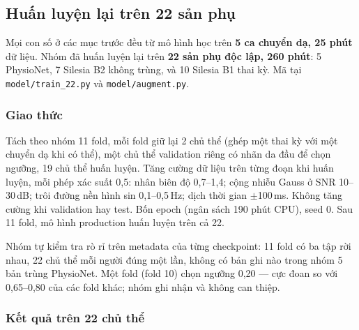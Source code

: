 \subsection{Huấn luyện lại trên 22 sản phụ}
\label{sec:model22}

Mọi con số ở các mục trước đều từ mô hình học trên \textbf{5 ca chuyển dạ, 25 phút} dữ liệu. Nhóm đã huấn
luyện lại trên \textbf{22 sản phụ độc lập, 260 phút}: 5 PhysioNet, 7 Silesia B2 không trùng, và 10
Silesia B1 thai kỳ. Mã tại \texttt{model/train\_22.py} và \texttt{model/augment.py}.

\subsubsection{Giao thức}

Tách theo nhóm 11 fold, mỗi fold giữ lại 2 chủ thể (ghép một thai kỳ với một chuyển dạ khi có thể), một
chủ thể validation riêng có nhãn da đầu để chọn ngưỡng, 19 chủ thể huấn luyện. Tăng cường dữ liệu trên
từng đoạn khi huấn luyện, mỗi phép xác suất 0,5: nhân biên độ 0,7--1,4; cộng nhiễu Gauss ở SNR 10--30\,dB;
trôi đường nền hình sin 0,1--0,5\,Hz; dịch thời gian $\pm$100\,ms. Không tăng cường khi validation hay
test. Bốn epoch (ngân sách 190 phút CPU), seed 0. Sau 11 fold, mô hình production huấn luyện trên cả 22.

Nhóm tự kiểm tra rò rỉ trên metadata của từng checkpoint: 11 fold có ba tập rời nhau, 22 chủ thể mỗi
người đúng một lần, không có bản ghi nào trong nhóm 5 bản trùng PhysioNet. Một fold (fold 10) chọn
ngưỡng 0,20 --- cực đoan so với 0,65--0,80 của các fold khác; nhóm ghi nhận và không can thiệp.

\subsubsection{Kết quả trên 22 chủ thể}

